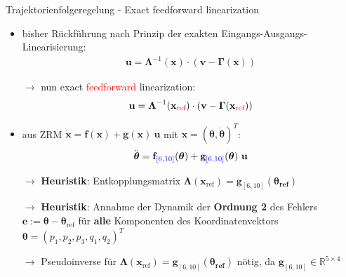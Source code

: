 \documentclass[
	ngerman,
	10pt,				%
	aspectratio=169, 	%
	xcolor=dvipsnames
]{beamer}
\begin{document}

\begin{frame}[t,fragile,label=trajektorienregelung_9]{\large Trajektorienfolgeregelung - Exact feedforward linearization}
	
	\begin{itemize}
		\item bisher Rückführung nach Prinzip der exakten Eingangs-Ausgangs-Linearisierung:
		\begin{align*}
			\mathbf{u} = \boldsymbol{\Lambda }^{-1}(\mathbf{x}) \cdot (\mathbf{v} - \boldsymbol{\Gamma}(\mathbf{x}))
		\end{align*}
		\pause
		\item[$\rightarrow$] nun exact \textcolor{red}{feedforward} linearization:
		\begin{align*}
			\mathbf{u} = \boldsymbol{\Lambda}^{-1}(\mathbf{x}_{\textcolor{red}{\text{ref}}}) \cdot (\mathbf{v} - \boldsymbol{\Gamma}(\mathbf{x}_{\textcolor{red}{\text{ref}}}))
		\end{align*}
		\pause
		\item aus ZRM $\dot{\mathbf{x}} = \mathbf{f}(\mathbf{x}) + \mathbf{g}(\mathbf{x}) \ \mathbf{u}$ mit $\mathbf{x} = (\boldsymbol{\theta}, \dot{\boldsymbol{\theta}})^T$:
		\begin{align*}
			\ddot{\boldsymbol{\theta}} = \mathbf{f}_{\textcolor{blue}{[6, 10]}}(\boldsymbol{\theta}) + \mathbf{g}_{\textcolor{blue}{[6, 10]}}(\boldsymbol{\theta}) \ \mathbf{u}
		\end{align*}
		\pause
		\item[$\rightarrow$] \textbf{Heuristik}: Entkopplungsmatrix $\boldsymbol{\Lambda}(\mathbf{x}_{\text{ref}}) = \mathbf{g}_{[6, 10]}(\boldsymbol{\theta_{\text{ref}}})$
		\pause
		\item[$\rightarrow$] \textbf{Heuristik}: Annahme der Dynamik der \textbf{Ordnung 2} des Fehlers $\mathbf{e} := \boldsymbol{\theta} - \boldsymbol{\theta}_{\text{ref}}$ für \textbf{alle} Komponenten des Koordinatenvektors $\boldsymbol{\theta} = (p_1, p_2, p_3, q_1, q_2)^T$
		\pause
		\item[$\rightarrow$] Pseudoinverse für $\boldsymbol{\Lambda}(\mathbf{x}_{\text{ref}}) = \mathbf{g}_{[6, 10]}(\boldsymbol{\theta_{\text{ref}}})$ nötig, da $\mathbf{g}_{[6, 10]} \in \mathbb{R}^{5 \times 4}$
		
	\end{itemize}
	

\end{frame}
\end{document}
